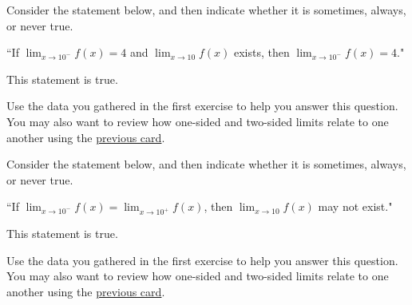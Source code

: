 \documentclass[handout]{ximera}
\begin{document}
\begin{exercise}

Consider the statement below, and then indicate whether it is sometimes, always, or never true.

``If $\displaystyle\lim_{x\to 10^-} f(x) = 4$ and $\displaystyle\lim_{x\to 10} f(x)$ exists, then $\displaystyle\lim_{x\to 10^-} f(x) = 4.$"

This statement is  true.

\begin{hint}

Use the data you gathered in the first exercise to help you answer this question.  You may also want to review how one-sided and two-sided limits relate to one another using the  \href{https://ximera.osu.edu/math160fa17/m160exam1content/whatIsALimit/digInWhatIsALimit}{previous card}.
\end{hint}

\end{exercise}

\begin{exercise}

Consider the statement below, and then indicate whether it is sometimes, always, or never true.

``If $\displaystyle\lim_{x\to 10^-} f(x) = \displaystyle\lim_{x\to 10^+} f(x)$, then $\displaystyle\lim_{x\to 10} f(x)$ may not exist."

This statement is  true.

\begin{hint}

Use the data you gathered in the first exercise to help you answer this question.  You may also want to review how one-sided and two-sided limits relate to one another using the \href{https://ximera.osu.edu/math160fa17/m160exam1content/whatIsALimit/digInWhatIsALimit}{previous card}.

\end{hint} 

\end{exercise}
\end{document}
